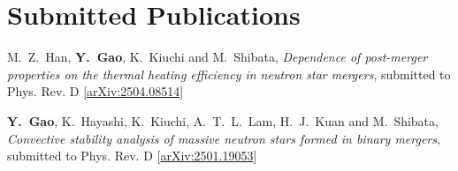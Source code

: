 \newcommand{\arxiv}[1]{[\href{http://arxiv.org/abs/#1}{arXiv:#1}]}
\newcommand{\citeCount}[1]{(#1 citations)}
\renewcommand{\citeCount}[1]{}


\setcounter{numPubs}{27}
\setcounter{pubCounter}{\value{numPubs}}

\section{\sc Submitted Publications}
\begin{etaremune}[start=\value{pubCounter}]
  \item
  M.~Z.~Han, {\bf Y.~Gao}, K.~Kiuchi and M.~Shibata,
  {\it Dependence of post-merger properties on the thermal heating efficiency in neutron star mergers},
  submitted to Phys. Rev. D
  \arxiv{2504.08514}
  \item
  {\bf Y.~Gao}, K.~Hayashi, K.~Kiuchi, A.~T.~L.~Lam, H.~J.~Kuan and M.~Shibata,
  {\it Convective stability analysis of massive neutron stars formed in binary mergers},
  submitted to Phys. Rev. D
  \arxiv{2501.19053}
\end{etaremune}



